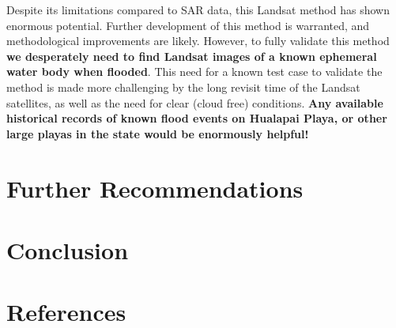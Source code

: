 \documentclass[
]{agujournal2019}
\begin{document}
Despite its limitations compared to SAR data, this Landsat method has
shown enormous potential. Further development of this method is
warranted, and methodological improvements are likely. However, to fully
validate this method \textbf{we desperately need to find Landsat images
of a known ephemeral water body when flooded}. This need for a known
test case to validate the method is made more challenging by the long
revisit time of the Landsat satellites, as well as the need for clear
(cloud free) conditions. \textbf{Any available historical records of
known flood events on Hualapai Playa, or other large playas in the state
would be enormously helpful!}

\section{Further Recommendations}\label{further-recommendations}

\section{Conclusion}\label{conclusion}

\section*{References}\label{references}
\end{document}
